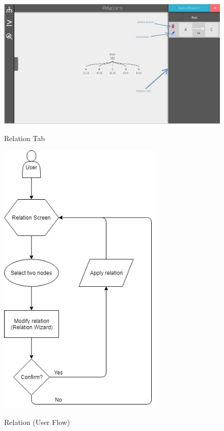 \documentclass[11pt]{article} %
\begin{document}
\begin{figure}
  \caption{Relation Tab}
  \centering
  \includegraphics[width=\textwidth]{relationTab}
  \label{screenshot:relation tab}
\end{figure}

\begin{figure}
  \caption{Relation (User Flow)}
  \centering
  \includegraphics[width=0.7\textwidth]{relationFlow}
  \label{diagram:relationFlow}
\end{figure}
\end{document}
